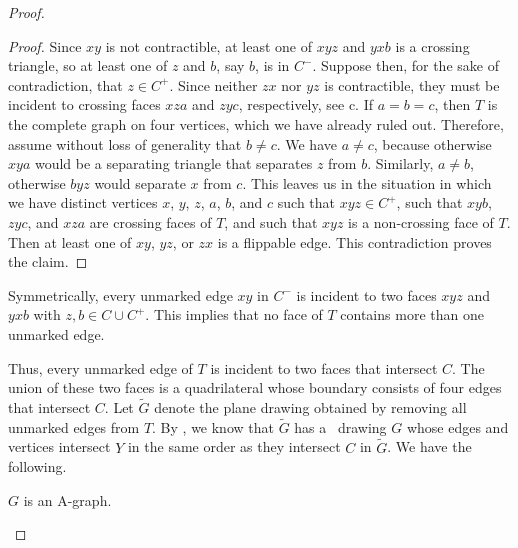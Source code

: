 \begin{proof}
	\begin{proof}
	Since $xy$ is not contractible, at least one of $xyz$ and $yxb$ is a
	crossing triangle, so at least one of $z$ and $b$, say $b$, is in $C^-$.
	Suppose then, for the sake of contradiction, that $z\in C^+$. Since neither $zx$ nor $yz$ is contractible,
	they must be incident to crossing faces $xza$ and $zyc$, respectively,
see c.
	If $a=b=c$, then $T$ is the complete graph on four vertices,
	which we have already ruled out.  Therefore, assume without loss of
	generality that $b\neq c$.  %
	We have $a\neq c$, because otherwise $xya$ would
be a separating triangle that
        separates $z$ from $b$. Similarly, $a\neq b$, otherwise $byz$ would separate $x$ from $c$.	
	This leaves us in the situation in which we have distinct vertices $x$,
	$y$, $z$, $a$, $b$, and $c$ such that $xyz\in C^+$, such that $xyb$, $zyc$, and $xza$
	are crossing faces of $T$, and such that $xyz$ is a non-crossing face of $T$.
	Then at least one of $xy$, $yz$, or $zx$ is a flippable edge. This contradiction proves the claim.
\end{proof}	

	Symmetrically, every unmarked edge $xy$ in $C^-$ is incident to two faces
	$xyz$ and $yxb$ with $z,b\in C \cup C^+$.  This implies that no face of $T$ contains more than one unmarked edge.
	
	Thus, every unmarked edge of $T$ is incident to two faces that intersect $C$. The union of these two faces is a quadrilateral whose boundary consists of four edges that intersect $C$.
	Let $\tilde{G}$ denote the plane drawing obtained by removing all unmarked edges
	from $T$.  By , we know that $\tilde G$ has
	a \Fary\ drawing $G$ whose edges and vertices intersect $Y$ in the
	same order as they intersect $C$ in $\tilde{G}$. We have the following.
	
	\begin{claimx} \label{claim-a-graph}
		$G$ is an A-graph.
	\end{claimx}
	

\end{proof}
